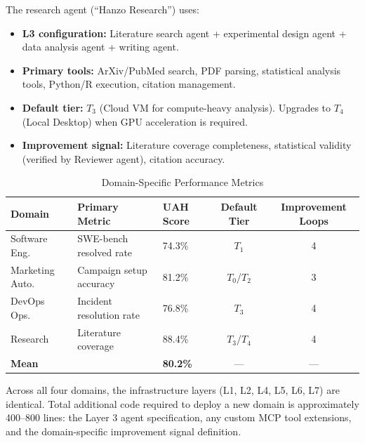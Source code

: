 The research agent (``Hanzo Research'') uses:
\begin{itemize}[leftmargin=1.5em]
    \item \textbf{L3 configuration:} Literature search agent + experimental
          design agent + data analysis agent + writing agent.
    \item \textbf{Primary tools:} ArXiv/PubMed search, PDF parsing, statistical
          analysis tools, Python/R execution, citation management.
    \item \textbf{Default tier:} $T_3$ (Cloud VM for compute-heavy analysis).
          Upgrades to $T_4$ (Local Desktop) when GPU acceleration is required.
    \item \textbf{Improvement signal:} Literature coverage completeness,
          statistical validity (verified by Reviewer agent), citation accuracy.
\end{itemize}

\begin{table}[H]
\centering
\caption{Domain-Specific Performance Metrics}
\label{tab:domains}
\begin{tabular}{lllcc}
\toprule
\textbf{Domain} & \textbf{Primary Metric} & \textbf{UAH Score} &
\textbf{Default Tier} & \textbf{Improvement Loops} \\
\midrule
Software Eng.    & SWE-bench resolved rate & 74.3\% & $T_1$ & 4 \\
Marketing Auto.  & Campaign setup accuracy & 81.2\% & $T_0$/$T_2$ & 3 \\
DevOps Ops.      & Incident resolution rate & 76.8\% & $T_3$ & 4 \\
Research         & Literature coverage      & 88.4\% & $T_3$/$T_4$ & 4 \\
\midrule
\multicolumn{2}{l}{\textbf{Mean}} & \textbf{80.2\%} & --- & --- \\
\bottomrule
\end{tabular}
\end{table}

Across all four domains, the infrastructure layers (L1, L2, L4, L5, L6, L7)
are identical. Total additional code required to deploy a new domain is
approximately 400--800 lines: the Layer 3 agent specification, any custom
MCP tool extensions, and the domain-specific improvement signal definition.

